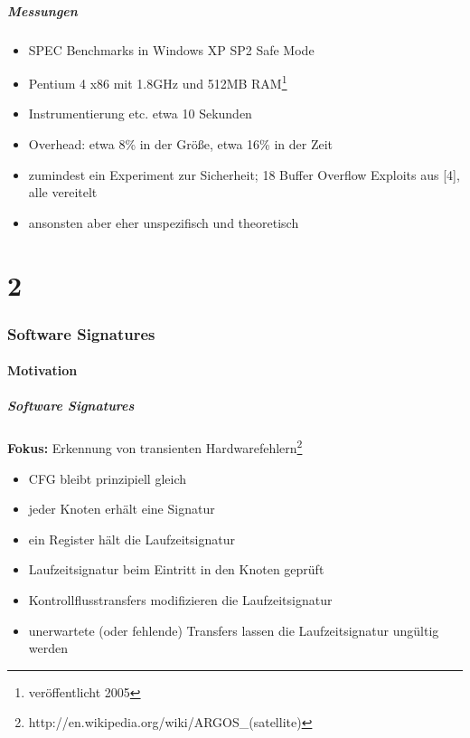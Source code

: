 \documentclass[mathserif,slidestop,compress,red]{beamer}
\begin{document}
\begin{frame}
  \frametitle{Messungen}
  \begin{itemize}
    \item SPEC Benchmarks in Windows XP SP2 Safe Mode
    \item Pentium 4 x86 mit 1.8GHz und 512MB RAM\footnote{veröffentlicht 2005}
    \item Instrumentierung etc. etwa 10 Sekunden
    \item Overhead: etwa 8\% in der Größe, etwa 16\% in der Zeit
    \vspace{1em}
    \item zumindest ein Experiment zur Sicherheit; 18 Buffer Overflow Exploits aus [4], alle vereitelt
    \item ansonsten aber eher unspezifisch und theoretisch
  \end{itemize}
\end{frame}

\part{2}
\section{Software Signatures}

\subsection{Motivation}

\begin{frame}
  \frametitle{Software Signatures}
  \textbf{Fokus:} Erkennung von transienten Hardwarefehlern\footnote{http://en.wikipedia.org/wiki/ARGOS\_(satellite)}
  \begin{itemize}
    \pause
    \item CFG bleibt prinzipiell gleich
    \pause
    \item jeder Knoten erhält eine Signatur
    \pause
    \item ein Register hält die Laufzeitsignatur
    \pause
    \item Laufzeitsignatur beim Eintritt in den Knoten geprüft
    \pause
    \item Kontrollflusstransfers modifizieren die Laufzeitsignatur
    \pause
    \item unerwartete (oder fehlende) Transfers lassen die Laufzeitsignatur ungültig werden
  \end{itemize}
\end{frame}
\end{document}
